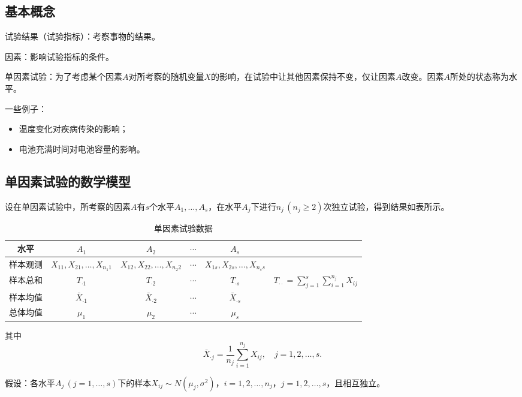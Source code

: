 \documentclass[11pt,a4paper]{report}
\theoremstyle{definition}
\begin{document}
\subsection{基本概念}

试验结果（试验指标）：考察事物的结果。

因素：影响试验指标的条件。

单因素试验：为了考虑某个因素$A$对所考察的随机变量$X$的影响，在试验中让其他因素保持不变，仅让因素$A$改变。因素$A$所处的状态称为水平。

一些例子：
\begin{itemize}[leftmargin=2em]
    \item 温度变化对疾病传染的影响；
    \item 电池充满时间对电池容量的影响。
\end{itemize}

\subsection{单因素试验的数学模型}

设在单因素试验中，所考察的因素$A$有$s$个水平$A_{1},\ldots,A_{s}$，在水平$A_{j}$下进行$n_{j}\,(n_{j}\geq 2)$次独立试验，得到结果如表所示。

\begin{table}[htbp]
\centering
\caption{单因素试验数据}
\begin{tabular}{@{}cccccc@{}}
\toprule
水平 & $A_{1}$ & $A_{2}$ & $\cdots$ & $A_{s}$ & \\
\midrule
样本观测 & $X_{11},X_{21},\ldots,X_{n_{1}1}$ & $X_{12},X_{22},\ldots,X_{n_{2}2}$ & $\cdots$ & $X_{1s},X_{2s},\ldots,X_{n_{s}s}$ & \\
样本总和 & $T_{\cdot 1}$ & $T_{\cdot 2}$ & $\cdots$ & $T_{\cdot s}$ & $T_{\cdot\cdot}=\displaystyle\sum_{j=1}^{s}\sum_{i=1}^{n_{j}}X_{ij}$ \\
样本均值 & $\bar{X}_{\cdot 1}$ & $\bar{X}_{\cdot 2}$ & $\cdots$ & $\bar{X}_{\cdot s}$ & \\
总体均值 & $\mu_{1}$ & $\mu_{2}$ & $\cdots$ & $\mu_{s}$ & \\
\bottomrule
\end{tabular}
\end{table}

其中
\[
\bar{X}_{\cdot j}=\frac{1}{n_{j}}\sum_{i=1}^{n_{j}}X_{ij},\quad j=1,2,\ldots,s.
\]

假设：各水平$A_{j}\,(j=1,\ldots,s)$下的样本$X_{ij}\sim N(\mu_{j},\sigma^{2})$，$i=1,2,\ldots,n_{j}$，$j=1,2,\ldots,s$，且相互独立。
\end{document}
